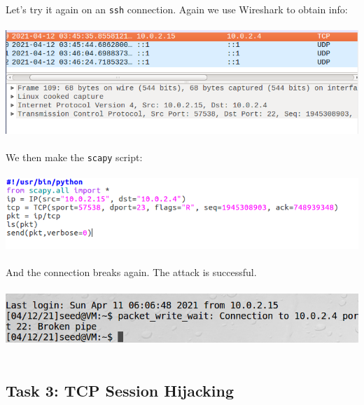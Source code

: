 \documentclass[a4paper]{article}
\begin{document}
Let's try it again on an \verb+ssh+ connection. Again we use Wireshark to obtain info:\\\\
\includegraphics[scale=0.7]{1/19.png}\\\\
We then make the \verb+scapy+ script:\\\\
\includegraphics[scale=0.7]{1/20.png}\\\\
And the connection breaks again. The attack is successful.\\\\
\includegraphics[scale=0.7]{1/21.png}\\\\
\subsection{Task 3: TCP Session Hijacking}
\end{document}
